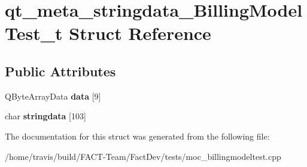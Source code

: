 \hypertarget{structqt__meta__stringdata__BillingModelTest__t}{\section{qt\-\_\-meta\-\_\-stringdata\-\_\-\-Billing\-Model\-Test\-\_\-t Struct Reference}
\label{structqt__meta__stringdata__BillingModelTest__t}
}
\subsection*{Public Attributes}
\begin{DoxyCompactItemize}
\item 
\hypertarget{structqt__meta__stringdata__BillingModelTest__t_a7abe46a1cd6580d69cdb7ac27b9f6c3e}{Q\-Byte\-Array\-Data {\bfseries data} \mbox{[}9\mbox{]}}\label{structqt__meta__stringdata__BillingModelTest__t_a7abe46a1cd6580d69cdb7ac27b9f6c3e}

\item 
\hypertarget{structqt__meta__stringdata__BillingModelTest__t_a3f5069c415e22d764fbcdde9e229a2c6}{char {\bfseries stringdata} \mbox{[}103\mbox{]}}\label{structqt__meta__stringdata__BillingModelTest__t_a3f5069c415e22d764fbcdde9e229a2c6}

\end{DoxyCompactItemize}


The documentation for this struct was generated from the following file\-:\begin{DoxyCompactItemize}
\item 
/home/travis/build/\-F\-A\-C\-T-\/\-Team/\-Fact\-Dev/tests/moc\-\_\-billingmodeltest.\-cpp\end{DoxyCompactItemize}

